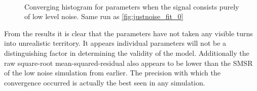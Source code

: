 \begin{figure}[H]
\centering
{}\\
\end{figure}

\begin{figure}[H]
\centering
{}
\caption{Converging histogram for parameters when the signal consists purely of low level noise. 
Same run as \autoref{fig:justnoise_fit_0}}
\label{fig:JustNoiseConvergence}
\end{figure}

From the results it is clear that the parameters have not taken any visible turns into
unrealistic territory. It appears individual parameters will not be a distinguishing factor
in determining the validity of the model. Additionally the raw square-root mean-squared-residual
also appears to be lower than the SMSR of the low noise simulation from earlier. 
The precision with which the convergence occurred is actually the best seen in any
simulation. 

